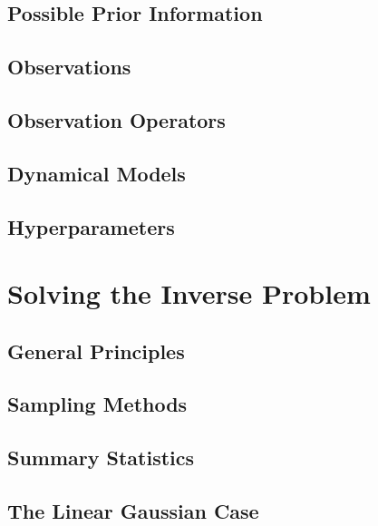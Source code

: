 \subsection{Possible Prior Information}
\label{rayner:ingredients:priors}

\subsection{Observations}
\label{rayner:ingredients:observations}

\subsection{Observation Operators}
\label{rayner:ingredients:obs_ops}

\subsection{Dynamical Models}
\label{rayner:ingredients:models}

\subsection{Hyperparameters}
\label{rayner:ingredients:hyperparameters}

\section{Solving the Inverse Problem}
\label{rayner:inverse_problem}

\subsection{General Principles}
\label{rayner:inverse_problem:principles}

\subsection{Sampling Methods}
\label{rayner:inverse_problem:sampling}

\subsection{Summary Statistics}
\label{rayner:inverse_problem:stats}

\subsection{The Linear Gaussian Case}
\label{rayner:inverse_problem:linear_gaussian}

